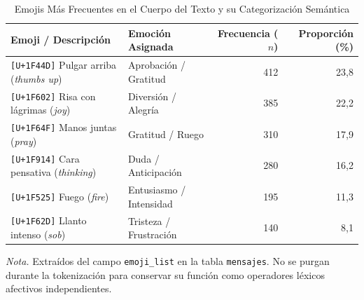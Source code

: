 \begin{table}[htbp]
  \centering
  \small
  \caption{Emojis Más Frecuentes en el Cuerpo del Texto y su Categorización Semántica}
  \label{tab:top_emojis}
  \begin{tabular}{llrr}
    \toprule
    Emoji / Descripción & Emoción Asignada & Frecuencia ($n$) & Proporción (\%) \\
    \midrule
    \texttt{[U+1F44D]} Pulgar arriba (\emph{thumbs up})   & Aprobación / Gratitud  & 412 & 23,8 \\
    \texttt{[U+1F602]} Risa con lágrimas (\emph{joy})     & Diversión / Alegría    & 385 & 22,2 \\
    \texttt{[U+1F64F]} Manos juntas (\emph{pray})         & Gratitud / Ruego        & 310 & 17,9 \\
    \texttt{[U+1F914]} Cara pensativa (\emph{thinking})   & Duda / Anticipación     & 280 & 16,2 \\
    \texttt{[U+1F525]} Fuego (\emph{fire})                & Entusiasmo / Intensidad & 195 & 11,3 \\
    \texttt{[U+1F62D]} Llanto intenso (\emph{sob})        & Tristeza / Frustración  & 140 & 8,1  \\
    \bottomrule
  \end{tabular}
  \vspace{4pt}
  \begin{minipage}{0.92\textwidth}
    \footnotesize
    \textit{Nota.} Extraídos del campo \texttt{emoji\_list} en la tabla \texttt{mensajes}. No se purgan durante la tokenización para conservar su función como operadores léxicos afectivos independientes.
  \end{minipage}
\end{table}
